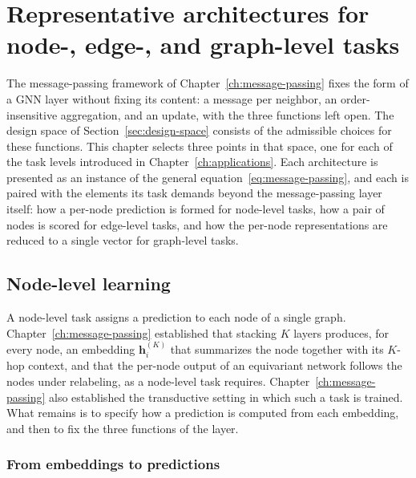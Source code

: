 \chapter{Representative architectures for node-, edge-, and graph-level tasks}
\label{ch:architectures}
\minitoc

The message-passing framework of Chapter~\ref{ch:message-passing} fixes the form
of a GNN layer without fixing its content: a message per neighbor, an
order-insensitive aggregation, and an update, with the three functions left open.
The design space of Section~\ref{sec:design-space} consists of the admissible
choices for these functions. This chapter selects three points in that space, one for each
of the task levels introduced in Chapter~\ref{ch:applications}. Each architecture
is presented as an instance of the general
equation~\eqref{eq:message-passing}, and each is paired with the elements its task
demands beyond the message-passing layer itself: how a per-node prediction is
formed for node-level tasks, how a pair of nodes is scored for edge-level tasks,
and how the per-node representations are reduced to a single vector for
graph-level tasks.

\section{Node-level learning}
\label{sec:node-level-arch}

A node-level task assigns a prediction to each node of a single graph.
Chapter~\ref{ch:message-passing} established that stacking
$K$ layers produces, for every node, an embedding $\mathbf{h}_i^{(K)}$ that
summarizes the node together with its $K$-hop context, and that the per-node
output of an equivariant network follows the nodes under relabeling, as a
node-level task requires. Chapter~\ref{ch:message-passing} also established the
transductive setting in which such a task is trained. What remains is to specify
how a prediction is computed from each embedding, and then to fix the three
functions of the layer.

\subsection{From embeddings to predictions}
\label{sec:node-task-elements}

